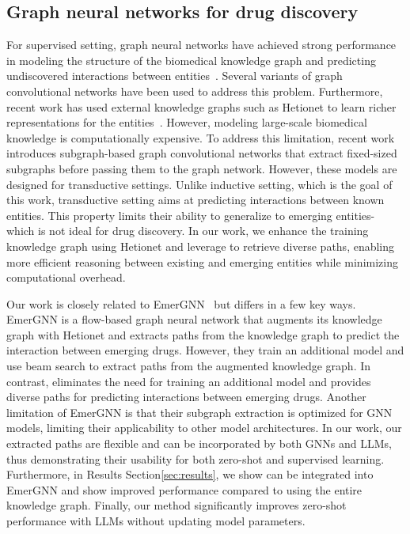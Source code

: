 \subsection{Graph neural networks for drug discovery}
For supervised setting, graph neural networks have achieved strong performance in modeling the structure of the biomedical knowledge graph and predicting undiscovered interactions between entities~\citep{zhang2023emergingdruginteractionprediction, wang2024accurate, lin2020kgnn,al2022prediction}.
Several variants of graph convolutional networks have been used to address this problem. 
Furthermore, recent work has used external knowledge graphs such as Hetionet to learn richer representations for the entities~\citep{hetionet2017, wang2024accurate}. 
However, modeling large-scale biomedical knowledge is computationally expensive.
To address this limitation, recent work introduces subgraph-based graph convolutional networks that extract fixed-sized subgraphs before passing them to the graph network.
However, these models are designed for transductive settings. Unlike inductive setting, which is the goal of this work, transductive setting aims at predicting interactions between known entities. This property limits their ability to generalize to emerging entities- which is not ideal for drug discovery.
In our work, we enhance the training knowledge graph using Hetionet and leverage \sys to retrieve diverse paths, enabling more efficient reasoning between existing and emerging entities while minimizing computational overhead.

Our work is closely related to EmerGNN~\citep{zhang2023emergingdruginteractionprediction} but differs in a few key ways. 
EmerGNN is a flow-based graph neural network that augments its knowledge graph with Hetionet and extracts paths from the knowledge graph to predict the interaction between emerging drugs. 
However, they train an additional model and use beam search to extract paths from the augmented knowledge graph.
In contrast, \sys eliminates the need for training an additional model and provides diverse paths for predicting interactions between emerging drugs.
Another limitation of EmerGNN is that their subgraph extraction is optimized for GNN models, limiting their applicability to other model architectures. 
In our work, our extracted paths are flexible and can be incorporated by both GNNs and LLMs, thus demonstrating their usability for both zero-shot and supervised learning.
Furthermore, in Results Section\ref{sec:results}, we show \sys can be integrated into EmerGNN and show improved performance compared to using the entire knowledge graph.
Finally, our method significantly improves zero-shot performance with LLMs without updating model parameters. 


